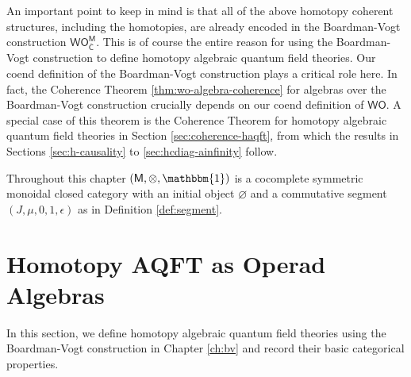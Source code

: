 \documentclass[11pt]{amsbook}
\numberwithin{section}{chapter}
\numberwithin{subsection}{section}
\numberwithin{equation}{section}
\theoremstyle{plain}
\theoremstyle{definition}
\newcommand{\C}{\mathsf{C}}
\newcommand{\M}{\mathsf{M}}
\renewcommand{\O}{\mathsf{O}}
\newcommand{\W}{\mathsf{W}}
\newcommand{\tensorunit}{\mathbbm{1}}
\newcommand{\Cbar}{\overline{\C}}
\newcommand{\Ocbar}{\O_{\Cbar}}
\newcommand{\Ocbarm}{\Ocbar^{\M}}
\newcommand{\wo}{\W\O}
\newcommand{\wocbarm}{\W\Ocbarm}
\begin{document}
An important point to keep in mind is that all of the above homotopy coherent structures, including the homotopies, are already encoded in the Boardman-Vogt construction $\wocbarm$.  This is of course the entire reason for using the Boardman-Vogt construction to define homotopy algebraic quantum field theories.  Our coend definition of the Boardman-Vogt construction plays a critical role here.  In fact, the Coherence Theorem \ref{thm:wo-algebra-coherence} for algebras over the Boardman-Vogt construction crucially depends on our coend definition of $\wo$.  A special case of this theorem is the Coherence Theorem for homotopy algebraic quantum field theories in Section \ref{sec:coherence-haqft}, from which the results in Sections \ref{sec:h-causality} to \ref{sec:hcdiag-ainfinity} follow.

Throughout this chapter $(\M,\otimes,\tensorunit)$ is a cocomplete symmetric monoidal closed category with an initial object $\varnothing$ and a commutative segment $(J,\mu,0,1,\epsilon)$ as in Definition \ref{def:segment}.


\section{Homotopy AQFT as Operad Algebras}\label{sec:haqft-operad}

In this section, we define homotopy algebraic quantum field theories using the Boardman-Vogt construction in Chapter \ref{ch:bv} and record their basic categorical properties.  
\end{document}
